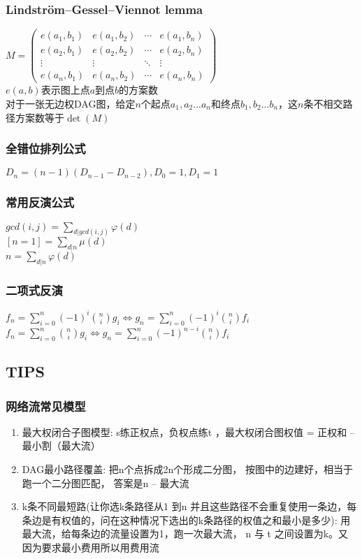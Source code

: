 \subsubsection{Lindström–Gessel–Viennot lemma}
$M = \begin{pmatrix} e(a_1,b_1) & e(a_1,b_2) & \cdots & e(a_1,b_n) \\ e(a_2,b_1) & e(a_2,b_2) & \cdots & e(a_2,b_n) \\ \vdots & \vdots & \ddots & \vdots \\ e(a_n,b_1) & e(a_n,b_2) & \cdots & e(a_n,b_n) \end{pmatrix}$\\
$e(a,b)$表示图上点$a$到点$b$的方案数\\
对于一张无边权DAG图，给定$n$个起点$a_1,a_2...a_n$和终点$b_1,b_2...b_n$，这$n$条不相交路径方案数等于$\det(M)$\\

\subsubsection{全错位排列公式}
$D_n=(n-1)(D_{n-1}-D_{n-2}),D_0=1,D_1=1$

\subsubsection{常用反演公式}
$gcd(i,j)=\sum_{d|gcd(i,j)}\varphi(d)$ \\
$[n=1]=\sum_{d|n}\mu(d)$\\
$n=\sum_{d|n}\varphi(d)$

\subsubsection{二项式反演}
$f_n=\sum_{i=0}^{n}(-1)^i\binom{n}{i}g_i \Leftrightarrow g_n=\sum_{i=0}^{n}(-1)^i\binom{n}{i}f_i$ \\
$f_n=\sum_{i=0}^{n}\binom{n}{i}g_i \Leftrightarrow g_n=\sum_{i=0}^{n}(-1)^{n-i}\binom{n}{i}f_i$ \\

\subsection{TIPS}
\subsubsection{网络流常见模型}
\begin{enumerate}
	\item 最大权闭合子图模型: s练正权点，负权点练t ，最大权闭合图权值 = 正权和 – 最小割（最大流）
	\item DAG最小路径覆盖: 把n个点拆成2n个形成二分图， 按图中的边建好，相当于跑一个二分图匹配， 答案是n – 最大流
	\item k条不同最短路(让你选k条路径从1 到n 并且这些路径不会重复使用一条边，每条边是有权值的，问在这种情况下选出的k条路径的权值之和最小是多少): 用最大流，给每条边的流量设置为1，跑一次最大流， n 与 t 之间设置为k。又因为要求最小费用所以用费用流
\end{enumerate}
